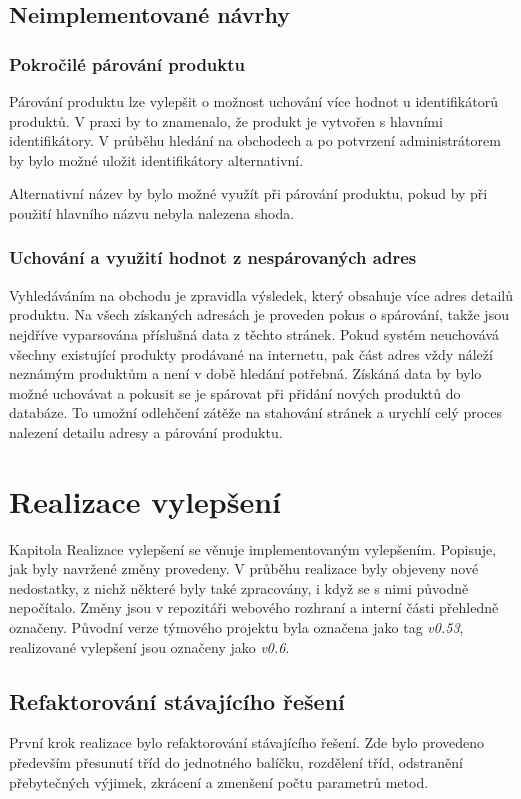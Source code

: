 \documentclass[thesis=B,czech]{FITthesis}[2012/06/26]
\begin{document}
\section{Neimplementované návrhy}
\subsection{Pokročilé párování produktu}
Párování produktu lze vylepšit o možnost uchování více hodnot u identifikátorů produktů. V praxi by to znamenalo, že produkt je vytvořen 
s hlavními identifikátory. V průběhu hledání na obchodech a po potvrzení administrátorem by bylo možné uložit identifikátory alternativní.
\par
Alternativní název by bylo možné využít při párování produktu, pokud by při použití hlavního názvu nebyla nalezena shoda.

\subsection{Uchování a využití hodnot z nespárovaných adres}
Vyhledáváním na obchodu je zpravidla výsledek, který obsahuje více adres detailů produktu. Na všech získaných adresách je proveden pokus o spárování, takže jsou nejdříve vyparsována příslušná data z těchto stránek. Pokud systém neuchovává všechny existující produkty prodávané na internetu, pak část adres vždy
náleží neznámým produktům a není v době hledání potřebná. Získáná data by bylo možné uchovávat a pokusit se je spárovat při přidání nových produktů do databáze.
To umožní odlehčení zátěže na stahování stránek a urychlí celý proces nalezení detailu adresy a párování produktu.


\chapter{Realizace vylepšení}\label{ch:realisation}
Kapitola Realizace vylepšení se věnuje implementovaným vylepšením. Popisuje, jak byly navržené změny provedeny.
V průběhu realizace byly objeveny nové nedostatky, z nichž některé byly také zpracovány, i když se s nimi původně nepočítalo.
Změny jsou v repozitáři webového rozhraní a interní části přehledně označeny. Původní verze týmového projektu byla označena jako
tag \textit{v0.53}, realizované vylepšení jsou označeny jako \textit{v0.6}.

\section{Refaktorování stávajícího řešení}
První krok realizace bylo refaktorování stávajícího řešení. Zde bylo provedeno především přesunutí tříd do jednotného balíčku, 
rozdělení tříd, odstranění přebytečných výjimek, zkrácení a zmenšení počtu parametrů metod.
\end{document}
